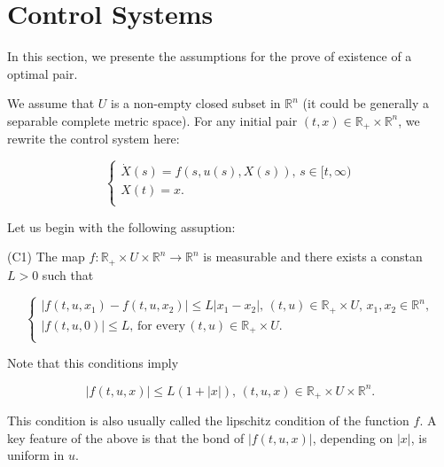 \section{Control Systems}

In this section, we presente the assumptions for the prove of existence of a optimal pair.

We assume that $U$ is a non-empty closed subset in $\mathbb{R}^n$ (it could be generally a separable complete metric space). For any initial pair $(t,x)\in \mathbb{R}_{+}\times\mathbb{R}^n$, we rewrite the control system here:

\begin{equation}\label{eq2.1}
	\left\{ \begin{array}{l}
	\dot{X}(s)=f(s,u(s),X(s)),\, s\in [t,\infty) \\
	X(t)=x.\\
	\end{array}
	\right.
\end{equation}

Let us begin with the following assuption:

(C1) The map $f:\mathbb{R}_{+}\times U\times \mathbb{R}^n\rightarrow \mathbb{R}^n$ is measurable and there exists a constan $L>0$ such that

$$\left\{ \begin{array}{l}
	|f(t,u,x_1)-f(t,u,x_2)|\leq L|x_1-x_2|,\, (t,u)\in \mathbb{R}_{+}\times U,\, x_1,x_2\in \mathbb{R}^n,\\
	|f(t,u,0)|\leq L,\,\mbox{for every}\,(t,u)\in \mathbb{R}_{+}\times U .\\
\end{array}
\right.$$

Note that this conditions imply

$$|f(t,u,x)|\leq L(1+|x|),\,(t,u,x)\in\mathbb{R}_{+}\times U\times \mathbb{R}^n.$$

This condition is also usually called the lipschitz condition of the function $f$. A key feature of the above is that the bond of $|f(t,u,x)|$, depending on $|x|$, is uniform in $u$.


